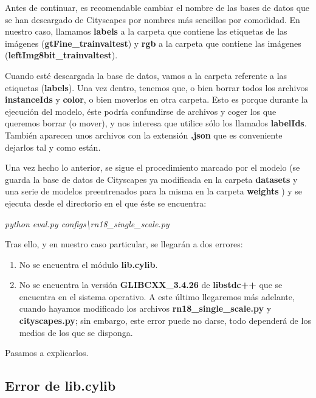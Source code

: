 Antes de continuar, es recomendable cambiar el nombre de las bases de datos que se han descargado de Cityscapes por nombres más sencillos por comodidad. En nuestro caso, llamamos \textbf{labels} a la carpeta que contiene las etiquetas de las imágenes (\textbf{gtFine\_trainvaltest}) y \textbf{rgb} a la carpeta que contiene las imágenes (\textbf{leftImg8bit\_trainvaltest}).

Cuando esté descargada la base de datos, vamos a la carpeta referente a las etiquetas (\textbf{labels}). Una vez dentro, tenemos que, o bien borrar todos los archivos \textbf{instanceIds} y \textbf{color}, o bien moverlos en otra carpeta. Esto es porque durante la ejecución del modelo, éste podría confundirse de archivos y coger los que queremos borrar (o mover), y nos interesa que utilice sólo los llamados \textbf{labelIds}. También aparecen unos archivos con la extensión \textbf{.json} que es conveniente dejarlos tal y como están.

Una vez hecho lo anterior, se sigue el procedimiento marcado por el modelo (se guarda la base de datos de Cityscapes ya modificada \cite{cityscapes} en la carpeta \textbf{datasets} y una serie de modelos preentrenados para la misma en la carpeta \textbf{weights} \cite{github_swiftnet}) y se ejecuta desde el directorio en el que éste se encuentra:

\begin{center}
\textit{python eval.py configs\textbackslash{rn18\_single\_scale.py}}
\end{center}

Tras ello, y en nuestro caso particular, se llegarán a dos errores:

\begin{enumerate}
\item No se encuentra el módulo \textbf{lib.cylib}.
\item No se encuentra la versión \textbf{GLIBCXX\_3.4.26} de \textbf{libstdc++} que se encuentra en el sistema operativo. A este último llegaremos más adelante, cuando hayamos modificado los archivos \textbf{rn18\_single\_scale.py} y \textbf{cityscapes.py}; sin embargo, este error puede no darse, todo dependerá de los medios de los que se disponga.
\end{enumerate}

Pasamos a explicarlos.

\subsection{Error de lib.cylib}

